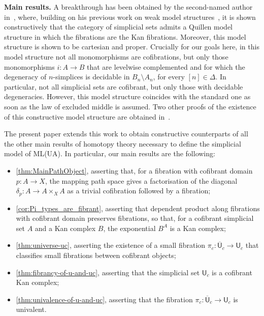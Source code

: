 \documentclass[reqno,10pt,a4paper,oneside,draft]{amsart}
\numberwithin{equation}{section}
\theoremstyle{mythm}
\theoremstyle{mydef}
\theoremstyle{myrmk}
\newcommand{\co}{\colon}
\newcommand{\UU}{\overline{\mathsf{U}}}
\newcommand{\U}{\mathsf{U}}
\begin{document}
\noindent
\textbf{Main results.}
A breakthrough has been obtained  by the second-named author in~\cite{henry2019qms}, where, building on his previous work on weak model structures~\cite{henry2018wms},
it is shown constructively that the category of simplicial sets admits a Quillen model structure in which the
fibrations are the Kan fibrations. Moreover, this model structure is shown to be cartesian and proper.  Crucially for our goals here,  in this model structure not all monomorphisms are 
cofibrations, but only those monomorphisms $i \co A \to B$ that are levelwise complemented 
and for which the degeneracy of $n$-simplices is decidable in $B_n \setminus A_n$, for every $[n] \in \Delta$. In particular, not all simplicial sets are cofibrant, but only those with decidable degeneracies. However, this model structure coincides with
the standard one as soon as the law of excluded middle is assumed. Two other  
proofs of the  existence of this constructive
model structure are obtained in~\cite{GambinoN:anocp}. 



 The present paper extends this work to obtain constructive counterparts of all the other main results of 
homotopy theory necessary to define the simplicial model of ML(UA). In particular, our main results are the following:
\begin{itemize}
\item \cref{thm:MainPathObject}, asserting that, for a fibration with cofibrant domain $p \co A \to X$, the mapping path space 
gives a factorisation of the diagonal $\delta_p \co A \to A \times_X A$ as a trivial cofibration followed by a fibration;
\item \cref{cor:Pi_types_are_fibrant}, asserting that dependent product along fibrations with cofibrant
domain preserves fibrations,  so that, for a cofibrant simplicial set $A$ and a Kan complex $B$, the exponential $B^A$ is a Kan complex; 
\item \cref{thm:universe-uc}, asserting the existence of a small fibration $\pi_c \co
\UU_c \to \U_c$ that classifies small fibrations between cofibrant objects;
\item \cref{thm:fibrancy-of-u-and-uc}, asserting that the simplicial set $\U_c$ is a cofibrant Kan complex;
\item \cref{thm:univalence-of-u-and-uc}, asserting that the fibration $\pi_c  \co
\UU_c \to \U_c$ is univalent.
\end{itemize}
\end{document}
